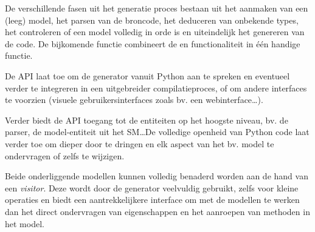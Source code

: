 De verschillende fasen uit het generatie proces bestaan uit het aanmaken van
een (leeg) model, het parsen van de broncode, het deduceren van onbekende
types, het controleren of een model volledig in orde is en uiteindelijk het
genereren van de code. De bijkomende  functie combineert de
 en  functionaliteit in \'e\'en handige functie.

De API laat toe om de generator vanuit Python aan te spreken en eventueel
verder te integreren in een uitgebreider compilatieproces, of om andere
interfaces te voorzien (visuele gebruikersinterfaces zoals bv. een
webinterface\dots).

Verder biedt de API toegang tot de entiteiten op het hoogste niveau, bv. de
parser, de model-entiteit uit het SM\dots De volledige openheid van Python code
laat verder toe om dieper door te dringen en elk aspect van het bv. model te
ondervragen of zelfs te wijzigen.

Beide onderliggende modellen kunnen volledig benaderd worden aan de hand van
een \emph{visitor}. Deze wordt door de generator veelvuldig gebruikt, zelfs
voor kleine operaties en biedt een aantrekkelijkere interface om met de
modellen te werken dan het direct ondervragen van eigenschappen en het
aanroepen van methoden in het model.

